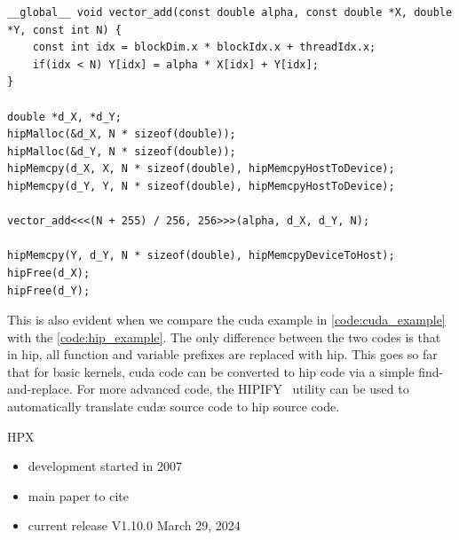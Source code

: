 \begin{listing}
    \begin{verbatim}
__global__ void vector_add(const double alpha, const double *X, double *Y, const int N) {
    const int idx = blockDim.x * blockIdx.x + threadIdx.x;
    if(idx < N) Y[idx] = alpha * X[idx] + Y[idx];
}
    
double *d_X, *d_Y;
hipMalloc(&d_X, N * sizeof(double));
hipMalloc(&d_Y, N * sizeof(double));
hipMemcpy(d_X, X, N * sizeof(double), hipMemcpyHostToDevice);
hipMemcpy(d_Y, Y, N * sizeof(double), hipMemcpyHostToDevice);

vector_add<<<(N + 255) / 256, 256>>>(alpha, d_X, d_Y, N);

hipMemcpy(Y, d_Y, N * sizeof(double), hipMemcpyDeviceToHost);
hipFree(d_X);
hipFree(d_Y);
    \end{verbatim}
    \caption{%
    A simple DAXPY example using \gls{hip} including all necessary memory and kernel launch operations.
    }
    \label{code:hip_example}
\end{listing}

This is also evident when we compare the \gls{cuda} example in \autoref{code:cuda_example} with the \autoref{code:hip_example}. 
The only difference between the two codes is that in \gls{hip}, all  function and variable prefixes are replaced with \gls{hip}. 
This goes so far that for basic kernels, \gls{cuda} code can be converted to \gls{hip} code via a simple find-and-replace. 
For more advanced code, the HIPIFY~\cite{advanced_micro_devices_rocmhipify_2025} utility can be used to automatically translate \gls{cudæ} source code to \gls{hip} source code. 








\newpage
HPX
\begin{itemize}
    \item development started in 2007~\cite{kaiser_stellar-grouphpx_2024}
    \item main paper to cite~\cite{kaiser_hpx_2020}
    \item current release V1.10.0 March 29, 2024~\cite{the_stear_group_history_nodate}
\end{itemize}

